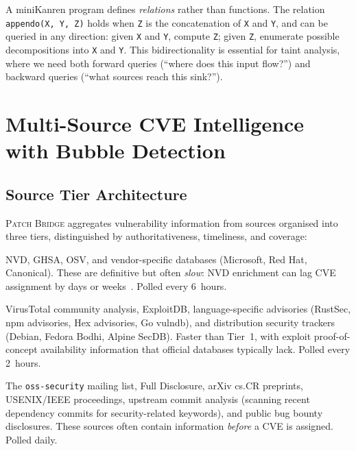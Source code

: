 \documentclass[11pt,twocolumn]{article}
\begin{document}
A miniKanren program defines \emph{relations} rather than functions.
The relation \texttt{appendo(X, Y, Z)} holds when \texttt{Z} is the
concatenation of \texttt{X} and \texttt{Y}, and can be queried in any
direction: given \texttt{X} and \texttt{Y}, compute \texttt{Z}; given
\texttt{Z}, enumerate possible decompositions into \texttt{X} and
\texttt{Y}. This bidirectionality is essential for taint analysis, where
we need both forward queries (``where does this input flow?'') and
backward queries (``what sources reach this sink?'').

\section{Multi-Source CVE Intelligence with Bubble Detection}
\label{sec:intelligence}

\subsection{Source Tier Architecture}

\textsc{Patch Bridge} aggregates vulnerability information from sources
organised into three tiers, distinguished by authoritativeness,
timeliness, and coverage:

\begin{description}[nosep,leftmargin=1em]
  \item[Tier~1: Authoritative Advisories.] NVD, GHSA, OSV, and
    vendor-specific databases (Microsoft, Red Hat, Canonical). These
    are definitive but often \emph{slow}: NVD enrichment can lag CVE
    assignment by days or weeks~\cite{nvd-lag}. Polled every 6~hours.
  \item[Tier~2: Community Intelligence.] VirusTotal community analysis,
    ExploitDB, language-specific advisories (RustSec, npm advisories,
    Hex advisories, Go vulndb), and distribution security trackers
    (Debian, Fedora Bodhi, Alpine SecDB). Faster than Tier~1, with
    exploit proof-of-concept availability information that official
    databases typically lack. Polled every 2~hours.
  \item[Tier~3: Long Tail.] The \texttt{oss-security} mailing list,
    Full Disclosure, arXiv cs.CR preprints, USENIX/IEEE proceedings,
    upstream commit analysis (scanning recent dependency commits for
    security-related keywords), and public bug bounty disclosures.
    These sources often contain information \emph{before} a CVE is
    assigned. Polled daily.
\end{description}
\end{document}
